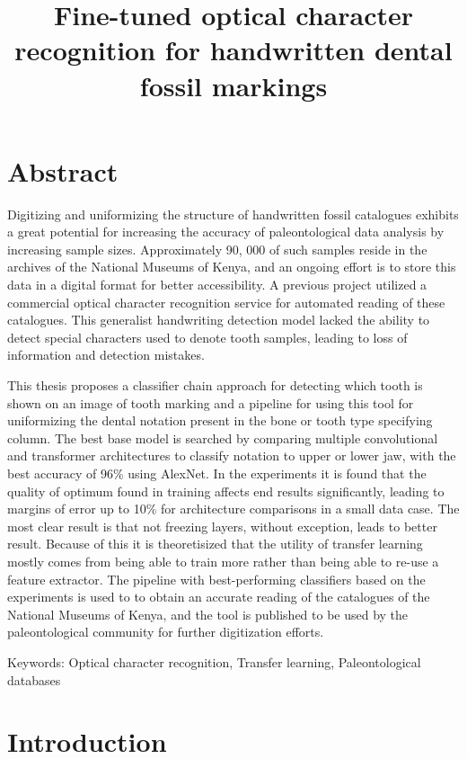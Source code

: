 \documentclass{article}
\title{Fine-tuned optical character recognition for handwritten dental fossil markings}
\begin{document}
\tableofcontents

\section{Abstract}

Digitizing and uniformizing the structure of handwritten fossil catalogues exhibits a great 
potential for increasing the accuracy of paleontological data analysis by increasing sample sizes. 
Approximately 90, 000 of such samples reside in the archives of the National Museums of Kenya, and 
an ongoing effort is to store this data in a digital format for better accessibility.
A previous project utilized a commercial optical character recognition service for automated reading of these catalogues. This generalist
handwriting detection model lacked the ability to detect special characters used to denote tooth samples,
 leading to loss of information and detection mistakes.

This thesis proposes a classifier chain approach for detecting which tooth is shown on an image of tooth marking 
and a pipeline for using this tool for uniformizing the dental notation present in 
the bone or tooth type specifying column. The best base model is searched by comparing multiple convolutional and transformer architectures
to classify notation to upper or lower jaw, with the best accuracy of 96\% using AlexNet. 
In the experiments it is found that the quality of optimum found in training affects end results significantly,
leading to margins of error up to 10\% for architecture comparisons in a small data case.
The most clear result is that not freezing layers, without exception, leads to better result.
Because of this it is theoretisized that the utility of transfer learning mostly comes from 
being able to train more rather than being able to re-use a feature extractor.
The pipeline with best-performing classifiers based on the experiments is used to
to obtain an accurate reading of the catalogues of the National Museums of Kenya, and the tool is published to be used 
by the paleontological community for further digitization efforts.

Keywords: Optical character recognition, Transfer learning, Paleontological databases

\section{Introduction}

\end{document}
